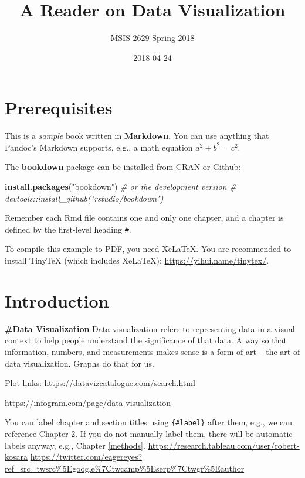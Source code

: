 \documentclass[]{book}
\title{A Reader on Data Visualization}
\author{MSIS 2629 Spring 2018}
\date{2018-04-24}
\newenvironment{Shaded}{\begin{snugshade}}{\end{snugshade}}
\newcommand{\KeywordTok}[1]{\textcolor[rgb]{0.13,0.29,0.53}{\textbf{#1}}}
\newcommand{\StringTok}[1]{\textcolor[rgb]{0.31,0.60,0.02}{#1}}
\newcommand{\CommentTok}[1]{\textcolor[rgb]{0.56,0.35,0.01}{\textit{#1}}}
\newcommand{\NormalTok}[1]{#1}
\theoremstyle{definition}
\theoremstyle{definition}
\theoremstyle{definition}
\theoremstyle{remark}
\begin{document}
\maketitle

{
\setcounter{tocdepth}{1}
\tableofcontents
}
\chapter{Prerequisites}\label{prerequisites}

This is a \emph{sample} book written in \textbf{Markdown}. You can use
anything that Pandoc's Markdown supports, e.g., a math equation
\(a^2 + b^2 = c^2\).

The \textbf{bookdown} package can be installed from CRAN or Github:

\begin{Shaded}
\begin{Highlighting}[]
\KeywordTok{install.packages}\NormalTok{(}\StringTok{"bookdown"}\NormalTok{)}
\CommentTok{# or the development version}
\CommentTok{# devtools::install_github("rstudio/bookdown")}
\end{Highlighting}
\end{Shaded}

Remember each Rmd file contains one and only one chapter, and a chapter
is defined by the first-level heading \texttt{\#}.

To compile this example to PDF, you need XeLaTeX. You are recommended to
install TinyTeX (which includes XeLaTeX):
\url{https://yihui.name/tinytex/}.

\chapter{Introduction}\label{intro}

\textbf{\#Data Visualization} Data visualization refers to representing
data in a visual context to help people understand the significance of
that data. A way so that information, numbers, and measurements makes
sense is a form of art -- the art of data visualization. Graphs do that
for us.

Plot links: \url{https://datavizcatalogue.com/search.html}

\url{https://infogram.com/page/data-visualization}

You can label chapter and section titles using \texttt{\{\#label\}}
after them, e.g., we can reference Chapter \ref{intro}. If you do not
manually label them, there will be automatic labels anyway, e.g.,
Chapter \ref{methods}.
\url{https://research.tableau.com/user/robert-kosara}
\url{https://twitter.com/eagereyes?ref_src=twsrc\%5Egoogle\%7Ctwcamp\%5Eserp\%7Ctwgr\%5Eauthor}
\end{document}
